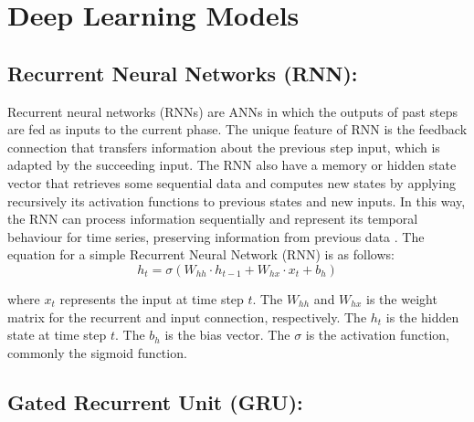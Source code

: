 
\chapter{Deep Learning Models} %

\label{c3} %


\section {Recurrent Neural Networks (RNN):}
Recurrent neural networks (RNNs) are ANNs in which the outputs of past steps are fed as inputs to the current phase. The unique feature of RNN is the feedback connection that transfers information about the previous step input, which is adapted by the succeeding input. The RNN also have a memory or hidden state vector that retrieves some sequential data and computes new states by applying recursively its activation functions to previous states and new inputs. In this way, the RNN can process information sequentially and represent its temporal behaviour for time series, preserving information from previous data \cite{thi2020deep}.
The equation for a simple Recurrent Neural Network (RNN) is as follows:
\begin{equation}
h_t=\sigma(W_{hh} \cdot h_{t-1} + W_{hx} \cdot x_t + b_h)
\end{equation}

where \(x_t\) represents the input at time step \(t\). The
\(W_{hh}\) and \(W_{hx}\) is the weight matrix for the recurrent and input connection, respectively. The
\(h_t\) is the hidden state at time step \(t\). The
\(b_h\) is the bias vector. The
\(\sigma\) is the activation function, commonly the sigmoid function.

\section{Gated Recurrent Unit (GRU):}

